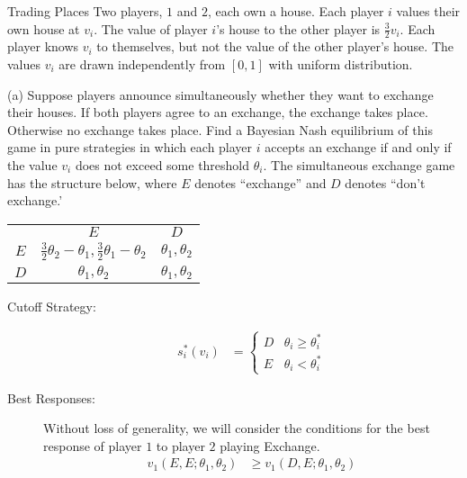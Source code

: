 \documentclass[9pt]{extarticle}
\begin{document}
  \begin{problem}{Trading Places}
    Two players, $1$ and $2$, each own a house. Each player $i$ values their own house at $v_i$. The value of player $i$'s house to the other player is $\frac{3}{2}v_i$. Each player knows $v_i$ to themselves, but not the value of the other player's house. The values $v_i$ are drawn independently from $[0,1]$ with uniform distribution.
    \tcblower
    \begin{problem}{(a)}
      Suppose players announce simultaneously whether they want to exchange their houses. If both players agree to an exchange, the exchange takes place. Otherwise no exchange takes place. Find a Bayesian Nash equilibrium of this game in pure strategies in which each player $i$ accepts an exchange if and only if the value $v_i$ does not exceed some threshold $\theta_{i}$.
      \tcblower
      The simultaneous exchange game has the structure below, where $E$ denotes ``exchange'' and $D$ denotes ``don't exchange.'
      \begin{center}
        \renewcommand{\arraystretch}{1.65}
        \begin{tabular}{c|c|c|}
          \multicolumn{1}{c}{} & \multicolumn{1}{c}{$E$} & \multicolumn{1}{c}{$D$}\\
          \cline{2-3}
          $E$ & $\frac{3}{2}\theta_2 - \theta_1,\frac{3}{2}\theta_1 - \theta_2$ & $\theta_1,\theta_2$\\
          \cline{2-3}
          $D$ & $\theta_1,\theta_2$ & $\theta_1,\theta_2$\\
          \cline{2-3}
        \end{tabular}
      \end{center}
      \begin{description}
        \item[Cutoff Strategy:]
          \begin{align*}
            s_{i}^{\ast}(v_i) &= \begin{cases}
              D & \theta_i \geq \theta_i^*\\
              E & \theta_i < \theta_i^*
            \end{cases}
          \end{align*}
        \item[Best Responses:] Without loss of generality, we will consider the conditions for the best response of player $1$ to player $2$ playing Exchange.
          \begin{align*}
            v_1(E,E;\theta_1,\theta_2) &\geq v_1(D,E;\theta_1,\theta_2)\\

\end{align*}
\end{description}
\end{problem}
\end{problem}
\end{document}
